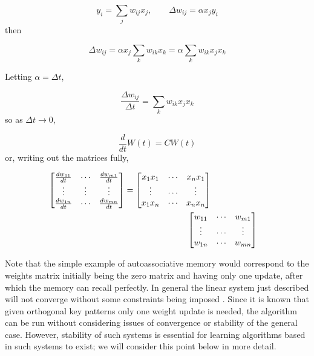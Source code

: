 \begin{equation*}
  y_i = \sum_{j} w_{ij} x_j, \qquad \Delta w_{ij} = \alpha x_j y_i
\end{equation*}
%
then

\begin{equation*}
\Delta w_{ij} = \alpha x_j \sum_k w_{ik} x_k = \alpha \sum_k w_{ik}x_j x_k
\end{equation*}

Letting $\alpha = \Delta t$,

\begin{equation*}
  \frac{\Delta w_{ij}}{\Delta t} = \sum_k w_{ik}x_j x_k
\end{equation*}
%
so as $\Delta t \rightarrow 0$,

\begin{equation*}
\frac{d}{dt}W(t) = C W(t)
\end{equation*}
%
or, writing out the matrices fully,

\begin{equation*}
  \begin{split}
  \begin{bmatrix}
    \frac{dw_{11}}{dt} & \cdots & \frac{dw_{m1}}{dt} \\
    \vdots & \vdots & \vdots \\
    \frac{dw_{1n}}{dt} & \cdots & \frac{dw_{mn}}{dt} \\    
  \end{bmatrix} = \begin{bmatrix}
    x_1 x_1 & \cdots & x_n x_1 \\
    \vdots & \cdots & \vdots \\
    x_1 x_n & \cdots & x_n x_n 
  \end{bmatrix} \\
  & \hspace{-1.0cm}\begin{bmatrix}
    w_{11} & \cdots & w_{m1} \\
    \vdots & \cdots & \vdots \\
    w_{1n} & \cdots & w_{mn}
    \end{bmatrix}
  \end{split}
\end{equation*}

Note that the simple example of autoassociative memory would correspond to the weights matrix initially being the zero matrix and having only one update, after which the memory can recall perfectly. In general the linear system just described will not converge without some constraints being imposed \cite[p. 40]{fyfe2000}. Since it is known that given orthogonal key patterns only one weight update is needed, the algorithm can be run without considering issues of convergence or stability of the general case. However, stability of such systems is essential for learning algorithms based in such systems to exist; we will consider this point below in more detail.

